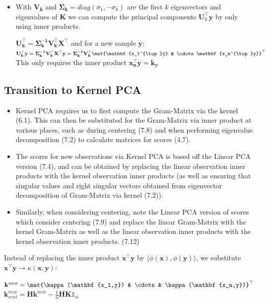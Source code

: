 \documentclass[english]{latex4ei/latex4ei_sheet}
\begin{document}
\begin{sectionbox}
\begin{itemize}
\begin{emphbox}
\end{emphbox}
\item With $\mathbf{V_k}$ and $\mathbf{\Sigma_k}=diag(\sigma_1, \cdots\sigma_k)$ are the first $k$ eigenvectors and eigenvalues of $\mathbf{K}$ we can compute the principal components $\mathbf{U}^{\top}_k\mathbf{y}$ by only using inner products.
\begin{emphbox}
    $\mathbf{U_k^{\top}}=\mathbf{\Sigma_k^{-1}V_k^{\top}X^{\top}}$ and for a new sample $\mathbf{y}$:\\
    $\mathbf{U_k^{\top}y}=\mathbf{\Sigma_k^{-1}V_k^{\top}X^{\top}y}=\mathbf{\Sigma_k^{-1}V_k^{\top}}\mat{\mathbf{x_1^{\top}y} & \cdots \mathbf{x_n^{\top}y}}^{\top}$\\
    This only requires the inner product $\mathbf{x_n^{\top}y=k_y}$
\end{emphbox}
\end{itemize}

\subsection{Transition to Kernel PCA}
\begin{itemize}
\item Kernel PCA requires us to first compute the Gram-Matrix via the kernel (6.1). This can then be substituted for the Gram-Matrix via inner product at various places, such as during centering (7.8) and when performing eigenvalue decomposition (7.2) to calculate matrices for scores (4.7).
\item The scores for new observations via Kernel PCA is based off the Linear PCA version (7.4), and can be obtained by replacing the linear observation inner products with the kernel observation inner products (as well as ensuring that singular values and right singular vectors obtained from eigenvector decomposition of Gram-Matrix via kernel (7.2)).
\item Similarly, when considering centering, note the Linear PCA version of scores which consider centering (7.9) and replace the linear Gram-Matrix with the kernel Gram-Matrix as well as the linear observation inner products with the kernel observation inner products. (7.12)
\end{itemize}
Instead of replacing the inner product $\mathbf{x^{\top}y}$ by $\langle\phi(\mathbf{x}),\phi(\mathbf{y})\rangle$, we substitute $\mathbf{x^{\top}y}\rightarrow\kappa(\mathbf{x,y})$:
\begin{emphbox}
    $\mathbf{k}^{new}=\mat{\kappa(\mathbf{x_1,y}) & \cdots & \kappa(\mathbf{x_n,y})}^{\top}$\\
    $\mathbf{k}_{cent}^{new}=\mathbf{Hk}_{}^{new}-\frac{1}{n}\mathbf{HK}\mathds{1}_n$
\end{emphbox}
\end{sectionbox}
\end{document}
